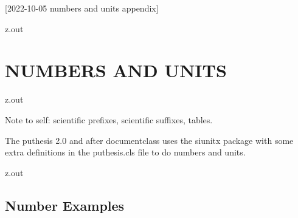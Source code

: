 [2022-10-05 numbers and units appendix]

%





\begin{VerbatimOut}{z.out}
\chapter{NUMBERS AND UNITS}
\end{VerbatimOut}

\MyIO


\begin{VerbatimOut}{z.out}

Note to self: scientific prefixes, scientific suffixes, tables.

The puthesis 2.0 and after documentclass uses the siunitx
package with some extra definitions in the puthesis.cls
file to do numbers and units.
\end{VerbatimOut}

\MyIO


\begin{VerbatimOut}{z.out}

\section{Number Examples}
\end{VerbatimOut}

\MyIO


